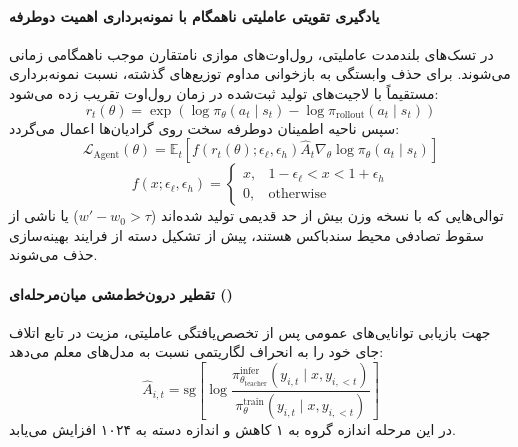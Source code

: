 \paragraph*{یادگیری تقویتی عاملیتی ناهمگام با نمونه‌برداری اهمیت دوطرفه}
در تسک‌های بلندمدت عاملیتی، رول‌اوت‌های موازی نامتقارن موجب ناهمگامی زمانی می‌شوند. برای حذف وابستگی به بازخوانی مداوم توزیع‌های گذشته، نسبت نمونه‌برداری مستقیماً با لاجیت‌های تولید ثبت‌شده در زمان رول‌اوت تقریب زده می‌شود:
\begin{equation}
    r_t(\theta) = \exp\left(\log \pi_\theta(a_t \mid s_t) - \log \pi_{\text{rollout}}(a_t \mid s_t)\right)
\end{equation}
سپس ناحیه اطمینان دوطرفه سخت روی گرادیان‌ها اعمال می‌گردد:
\begin{equation}
    \mathcal{L}_{\text{Agent}}(\theta) = \mathbb{E}_t \left[ f(r_t(\theta); \epsilon_\ell, \epsilon_h) \hat{A}_t \nabla_\theta \log \pi_\theta(a_t \mid s_t) \right]
\end{equation}
\begin{equation}
    f(x; \epsilon_\ell, \epsilon_h) = \begin{cases} x, & 1 - \epsilon_\ell < x < 1 + \epsilon_h \\ 0, & \text{otherwise} \end{cases}
\end{equation}
توالی‌هایی که با نسخه وزن بیش از حد قدیمی تولید شده‌اند ($w' - w_0 > \tau$) یا ناشی از سقوط تصادفی محیط سندباکس هستند، پیش از تشکیل دسته از فرایند بهینه‌سازی حذف می‌شوند.

\paragraph*{تقطیر درون‌خط‌مشی میان‌مرحله‌ای ()}
جهت بازیابی توانایی‌های عمومی پس از تخصص‌یافتگی عاملیتی، مزیت در تابع اتلاف جای خود را به انحراف لگاریتمی نسبت به مدل‌های معلم می‌دهد:
\begin{equation}
    \hat{A}_{i,t} = \text{sg}\left[ \log \frac{\pi_{\theta_{\text{teacher}}}^{\text{infer}}(y_{i,t} \mid x, y_{i,<t})}{\pi_\theta^{\text{train}}(y_{i,t} \mid x, y_{i,<t})} \right]
\end{equation}
در این مرحله اندازه گروه به ۱ کاهش و اندازه دسته به ۱۰۲۴ افزایش می‌یابد.

